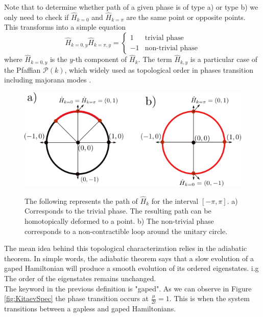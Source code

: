 Note that to determine whether path of a given phase is of type a) or type b) we only need to check if $\hat{H}_{k=0}$ and $\hat{H}_{k=\pi}$ are the same point or opposite points. This transforms into a simple equation 
\begin{equation}
    \hat{H}_{k=0,y}\hat{H}_{k=\pi,y}=\begin{cases}
1 & \mbox{trivial phase}\\
-1 & \mbox{non-trivial phase}
\end{cases}
\end{equation}
where $\hat{H}_{k=0,y}$ is the $y$-th component of $\hat{H}_{k}$. The term $\hat{H}_{k,y}$ is a particular case of the Pfaffian $\mathcal{P}(k)$, which widely used as topological order in  phases transition including  majorana modes . 


\begin{figure}[t]
    \centering
    \includegraphics[scale=0.8]{IMAGES/Majorana/Topological.png}
    \label{fig:topological}
    \caption{ The following represents the path of $\hat{H}_k$ for the interval $[ -\pi, \pi ]$. a) Corresponds to the trivial phase. The resulting path can be homotopically deformed to a point. b) The non-trivial phase corresponds to a non-contractible loop around the unitary circle. \protect {}} 
\end{figure}

The mean idea behind this topological characterization relies in the adiabatic theorem.  In simple words, the adiabatic theorem says that a slow evolution of a gaped Hamiltonian will produce a smooth evolution of its ordered eigenstates. i.g The order of the eigenstates remains unchanged. \\

The keyword in the previous definition is "gaped". As we can observe in Figure \ref{fig:KitaevSpec} the phase transition occurs at $\frac{\mu}{2t}=1$. This is when the system transitions between a gapless and gaped Hamiltonians.  \\


